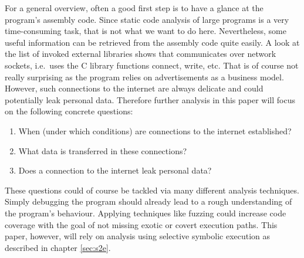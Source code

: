 For a general overview, often a good first step is to have a glance at the program's assembly code.
Since static code analysis of large programs is a very time-consuming task, that is not what we want to do here.
Nevertheless, some useful information can be retrieved from the assembly code quite easily.
A look at the list of invoked external libraries shows that \app communicates over network sockets, i.e.~uses the C library functions connect, write, etc.
That is of course not really surprising as the program relies on advertisements as a business model.
However, such connections to the internet are always delicate and could potentially leak personal data.
Therefore further analysis in this paper will focus on the following concrete questions:
\begin{enumerate}
  \item When (under which conditions) are connections to the internet established?
  \item What data is transferred in these connections?
  \item Does a connection to the internet leak personal data?
\end{enumerate}
These questions could of course be tackled via many different analysis techniques.
Simply debugging the program should already lead to a rough understanding of the program's behaviour.
Applying techniques like fuzzing  could increase code coverage with the goal of not missing exotic or covert execution paths.
This paper, however, will rely on analysis using selective symbolic execution as described in chapter \ref{sec:s2e}.






\iffalse
§4	Project idea: explore privacy issues in a sample binary
		> Plan darlegen: Programme könnten unerwünscht Infos preisgeben.
		> Daher: Eigenes kleines Programm, das … macht.
\fi